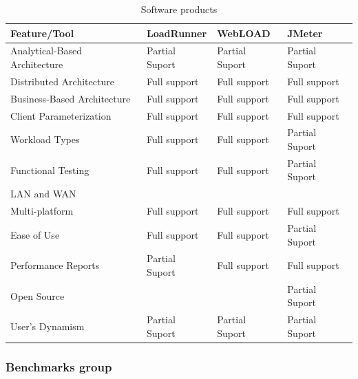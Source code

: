 \documentclass{report}
\begin{document}
\begin{table}[h]
\centering
\caption{Software products}
\label{tab: tabtool2}
\begin{tabular}{|l|l|l|l|}
\hline
\rowcolor[HTML]{EFEFEF}
\textbf{Feature/Tool}         & \textbf{LoadRunner} & \textbf{WebLOAD} & \textbf{JMeter} \\ \hline
Analytical-Based Architecture & Partial Suport      & Partial Suport   & Partial Suport  \\ \hline
Distributed Architecture      & Full support        & Full support     & Full support    \\ \hline
Business-Based Architecture   & Full support        & Full support     & Full support    \\ \hline
Client Parameterization       & Full support        & Full support     & Full support    \\ \hline
Workload Types                & Full support        & Full support     & Partial Suport  \\ \hline
Functional Testing            & Full support        & Full support     & Partial Suport  \\ \hline
LAN and WAN                   &                     &                  &                 \\ \hline
Multi-platform                & Full support        & Full support     & Full support    \\ \hline
Ease of Use                   & Full support        & Full support     & Partial Suport  \\ \hline
Performance Reports           & Partial Suport      & Full support     & Full support    \\ \hline
Open Source                   &                     &                  & Partial Suport  \\ \hline
User’s Dynamism               & Partial Suport      & Partial Suport   & Partial Suport  \\ \hline
\end{tabular}
\end{table}

\subsubsection{Benchmarks group}
\end{document}
